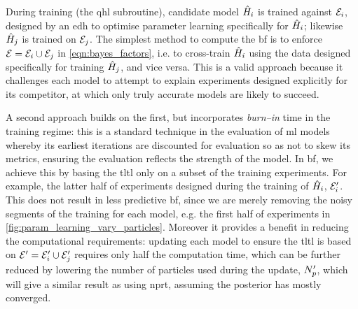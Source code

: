 During training (the \gls{qhl} subroutine), candidate model $\hat{H}_i$ is trained against ${ \mathcal{E} }_i$, 
    designed by an \gls{edh} to optimise parameter learning specifically for $\hat{H}_i$;
    likewise $\hat{H}_j$ is trained on ${ \mathcal{E} }_j$. 
The simplest method to compute the \gls{bf} is to enforce ${ \mathcal{E} }={ \mathcal{E} }_i \cup { \mathcal{E} }_j$ 
    in \cref{eqn:bayes_factors}, i.e. to cross-train $\hat{H}_i$ using the data designed specifically for training $\hat{H}_j$, 
    and vice versa. 
This is a valid approach because it challenges each model to attempt to explain \glspl{experiment}
    designed explicitly for its competitor,   
    at which only truly accurate models are likely to succeed. 
\par 
A second approach builds on the first, but incorporates \emph{burn--in} time in the training regime:
    this is a standard technique in the evaluation of \gls{ml} models whereby its earliest iterations 
    are discounted for evaluation so as not to skew its metrics, 
    ensuring the evaluation reflects the strength of the model. 
In \gls{bf}, we achieve this by basing the \gls{tltl} only on a subset of the training \glspl{experiment}. 
For example, the latter half of \glspl{experiment} designed during the training of $\hat{H}_i$, ${ \mathcal{E} }_i^{\prime}$. 
This does not result in less predictive \gls{bf}, since we are merely removing the 
    noisy segments of the training for each model, e.g. the first half of \glspl{experiment} in \cref{fig:param_learning_vary_particles}. 
Moreover it provides a benefit in reducing the computational requirements: 
    updating each model to ensure the \gls{tltl} is based on ${ \mathcal{E} }^{\prime}={ \mathcal{E} }_i^{\prime} \cup { \mathcal{E} }_j^{\prime}$
    requires only half the computation time, 
    which can be further reduced by lowering the number of \glspl{particle} used during the update, $N_p^{\prime}$, 
    which will give a similar result as using \gls{nprt}, assuming the posterior has mostly converged\footnotemark.
\par 

